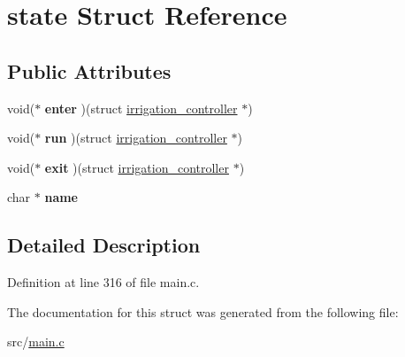 \hypertarget{structstate}{}\section{state Struct Reference}
\label{structstate}
\subsection*{Public Attributes}
\begin{DoxyCompactItemize}
\item 
\hypertarget{structstate_a6524009fb107464c8bb47a14742c3f27}{}void($\ast$ {\bfseries enter} )(struct \hyperlink{structirrigation__controller}{irrigation\+\_\+controller} $\ast$)\label{structstate_a6524009fb107464c8bb47a14742c3f27}

\item 
\hypertarget{structstate_a64a1989f8b49bc262c04323be37d1d8c}{}void($\ast$ {\bfseries run} )(struct \hyperlink{structirrigation__controller}{irrigation\+\_\+controller} $\ast$)\label{structstate_a64a1989f8b49bc262c04323be37d1d8c}

\item 
\hypertarget{structstate_a4657a6bf0f9e2f16002217c54cb967cd}{}void($\ast$ {\bfseries exit} )(struct \hyperlink{structirrigation__controller}{irrigation\+\_\+controller} $\ast$)\label{structstate_a4657a6bf0f9e2f16002217c54cb967cd}

\item 
\hypertarget{structstate_a351d79011f95723018e1626646bb28c7}{}char $\ast$ {\bfseries name}\label{structstate_a351d79011f95723018e1626646bb28c7}

\end{DoxyCompactItemize}


\subsection{Detailed Description}


Definition at line 316 of file main.\+c.



The documentation for this struct was generated from the following file\+:\begin{DoxyCompactItemize}
\item 
src/\hyperlink{main_8c}{main.\+c}\end{DoxyCompactItemize}
